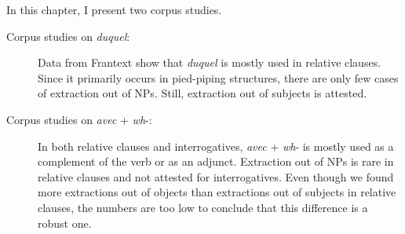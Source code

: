 In this chapter, I present two corpus studies.

\begin{description}

\item[Corpus studies on \emph{duquel}:] Data from Frantext show that \emph{duquel} is mostly used in relative clauses. Since it primarily occurs in pied-piping structures, there are only few cases of extraction out of NPs. Still, extraction out of subjects is attested.

\item[Corpus studies on \emph{avec} + \textit{wh}-:] In both relative clauses and interrogatives, \textit{avec} + \textit{wh}- is mostly used as a complement of the verb or as an adjunct. Extraction out of NPs is rare in relative clauses and not attested for interrogatives. Even though we found more extractions out of objects than extractions out of subjects in relative clauses, the numbers are too low to conclude that this difference is a robust one.

\end{description}